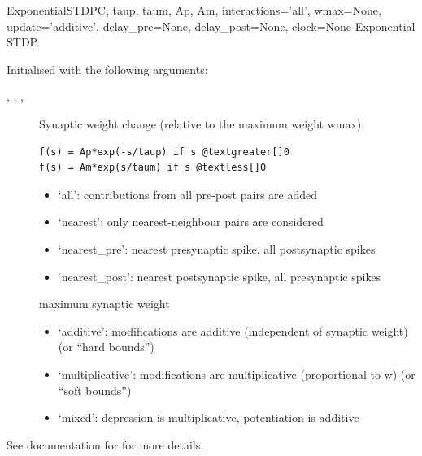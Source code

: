 \documentclass[letterpaper,10pt,english]{manual}
\begin{document}
\hypertarget{brian.ExponentialSTDP}{}\begin{classdesc}{ExponentialSTDP}{C, taup, taum, Ap, Am, interactions='all', wmax=None, update='additive', delay\_pre=None, delay\_post=None, clock=None}
Exponential STDP.

Initialised with the following arguments:
\begin{description}
\item[, , , ]
Synaptic weight change (relative to the maximum weight wmax):

\begin{Verbatim}[commandchars=@\[\]]
f(s) = Ap*exp(-s/taup) if s @textgreater[]0
f(s) = Am*exp(s/taum) if s @textless[]0
\end{Verbatim}

\item[]\begin{itemize}
\item {} 
`all': contributions from all pre-post pairs are added

\item {} 
`nearest': only nearest-neighbour pairs are considered

\item {} 
`nearest\_pre': nearest presynaptic spike, all postsynaptic spikes

\item {} 
`nearest\_post': nearest postsynaptic spike, all presynaptic spikes

\end{itemize}

\item[]
maximum synaptic weight

\item[]\begin{itemize}
\item {} 
`additive': modifications are additive (independent of synaptic weight)
(or ``hard bounds'')

\item {} 
`multiplicative': modifications are multiplicative (proportional to w)
(or ``soft bounds'')

\item {} 
`mixed': depression is multiplicative, potentiation is additive

\end{itemize}

\end{description}

See documentation for \hyperlink{brian.STDP}{} for more details.
\end{classdesc}
\end{document}
